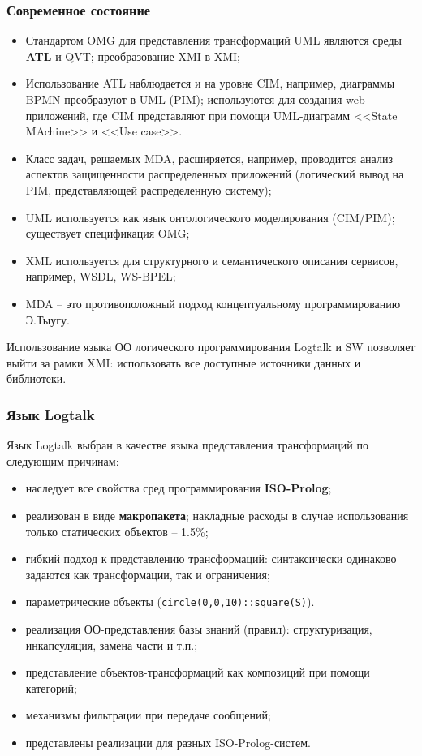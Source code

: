 \documentclass[10pt]{beamer}
\begin{document}
\begin{frame}
  \frametitle{Современное состояние}
  \begin{itemize}
  \item Стандартом OMG для представления трансформаций UML являются среды \textbf{ATL} и QVT; преобразование XMI в XMI;
  \item Использование ATL наблюдается и на уровне CIM, например, диаграммы BPMN преобразуют в UML (PIM); используются для создания web-приложений, где CIM представляют при помощи UML-диаграмм <<State MAchine>> и <<Use case>>.
  \item Класс задач, решаемых MDA, расширяется, например, проводится анализ аспектов защищенности распределенных приложений (логический вывод на PIM, представляющей распределенную систему);
  \item UML используется как язык онтологического моделирования (CIM/PIM); существует спецификация OMG; %
  \item XML используется для структурного и семантического описания сервисов, например, WSDL, WS-BPEL;
  \item MDA -- это противоположный подход концептуальному программированию Э.Тыугу.
  \end{itemize}

  Использование языка ОО логического программирования Logtalk и SW позволяет выйти за рамки XMI: использовать все доступные источники данных и библиотеки.
\end{frame}
\begin{frame}
  \frametitle{Язык Logtalk}
  Язык Logtalk выбран в качестве языка представления трансформаций по следующим причинам:
  \begin{itemize}
  \item наследует все свойства сред программирования \textbf{ISO-Prolog};
  \item реализован в виде \textbf{макропакета}; накладные расходы в случае использования только статических объектов -- 1.5\%;
  \item гибкий подход к представлению трансформаций: синтаксически одинаково задаются как трансформации, так и ограничения;
  \item параметрические объекты (\texttt{circle(0,0,10)::square(S)}).
  \item реализация ОО-представления базы знаний (правил): структуризация, инкапсуляция, замена части и т.п.;
  \item представление объектов-трансформаций как композиций при помощи категорий;
  \item механизмы фильтрации при передаче сообщений;
  \item представлены реализации для разных ISO-Prolog-систем.
  \end{itemize}
\end{frame}
\end{document}

